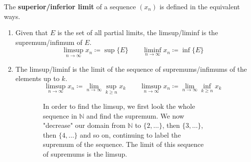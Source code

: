   \begin{definition}
    The \textbf{superior/inferior limit} of a sequence $(x_n)$ is defined in the equivalent ways. 
    \begin{enumerate}
      \item Given that $E$ is the set of all partial limits, the limsup/liminf is the supremum/infimum of $E$. 
      \begin{equation}
        \limsup_{n \rightarrow \infty} x_n \coloneqq \sup\{E\} \qquad \liminf_{n \rightarrow \infty} x_n \coloneqq \inf\{E\}
      \end{equation}
      \item The limsup/liminf is the limit of the sequence of supremums/infimums of the elements up to $k$.  
      \begin{equation}
        \limsup_{n \rightarrow \infty} x_n \coloneqq \lim_{n \rightarrow \infty} \sup_{k \geq n} x_k \qquad \limsup_{n \rightarrow \infty} x_n \coloneqq \lim_{n \rightarrow \infty} \inf_{k \geq n} x_k 
      \end{equation}
    \end{enumerate}

    \begin{figure}[H]
      \centering
      \begin{subfigure}[b]{0.48\textwidth}
        \centering
        \caption{In order to find the limsup, we first look the whole sequence in $\mathbb{N}$ and find the supremum. We now "decrease" our domain from $\mathbb{N}$ to $\{2, \ldots\}$, then $\{3, \ldots\}$, then $\{4, \ldots\}$ and so on, continuing to label the supremum of the sequence. The limit of this sequence of supremums is the limsup.}
        \label{fig:limsupinf1}
      \end{subfigure}
      \hfill 
      \begin{subfigure}[b]{0.48\textwidth}
        \centering
\end{subfigure}
\end{figure}
\end{definition}
